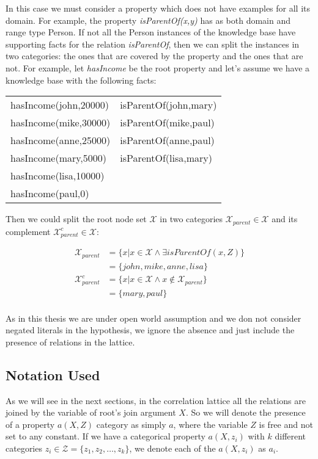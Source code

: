 In this case we must consider a property which does not have examples for all its domain. For example, the property
\emph{isParentOf(x,y)} has as both domain and range type Person. If not all the Person instances of the knowledge base
have supporting facts for the relation \emph{isParentOf}, then we can split the instances in two categories: the ones
that are covered by the property and the ones that are not. For example, let \emph{hasIncome} be the root property and
let's assume we have a knowledge base with the following facts:

\begin{tabular}{*{2}{l}}
  hasIncome(john,20000) & isParentOf(john,mary) \\
  hasIncome(mike,30000) & isParentOf(mike,paul) \\
  hasIncome(anne,25000) & isParentOf(anne,paul) \\
  hasIncome(mary,5000) 	& isParentOf(lisa,mary) \\
  hasIncome(lisa,10000) & 			\\
  hasIncome(paul,0)	& 			\\
\end{tabular}

Then we could split the root node set $\mathcal{X}$ in two categories $\mathcal{X}_{parent} \in \mathcal{X}$ and its
complement $\mathcal{X}_{parent}^{c} \in \mathcal{X}$:

\begin{align*}
 \mathcal{X}_{parent}&=\{x| x \in \mathcal{X} \land \exists isParentOf(x,Z)\} \\
  &=\{john,mike,anne,lisa\} \\
 \mathcal{X}_{parent}^{c}&=\{x| x \in \mathcal{X} \land x \not \in \mathcal{X}_{parent} \} \\
  &=\{mary,paul\} \\
\end{align*}

As in this thesis we are under open world assumption and we don not consider negated literals in the hypothesis, we
ignore the absence and just include the presence of relations in the lattice.


\subsection{Notation Used}

As we will see in the next sections, in the correlation lattice all the relations are joined by the variable of root's
join argument $X$. So we will denote the presence of a property $a(X,Z)$ category as simply $a$, where the variable $Z$
is free and not set to any constant. If we have a categorical property $a(X,z_i)$ with $k$ different categories $z_i \in
\mathcal{Z}=\{ z_1,z_2,\ldots,z_k\}$, we denote each of the $a(X,z_i)$ as $a_i$.

